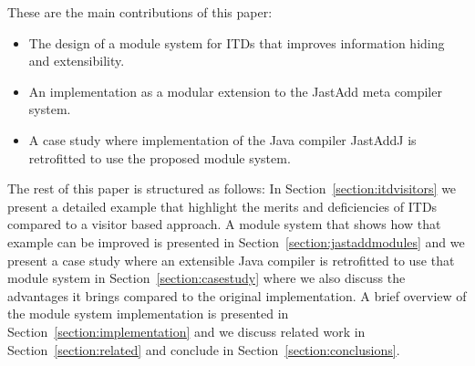 These are the main contributions of this paper:
\begin{itemize}
\item The design of a module system for ITDs that improves information
hiding and extensibility.
\item An implementation as a modular extension to the Jast\-Add meta 
compiler system.
\item A case study where implementation of the Java compiler JastAddJ is retrofitted to use the
proposed module system.
\end{itemize}

The rest of this paper is structured as follows: In
Section~\ref{section:itdvisitors} we present a detailed example that
highlight the merits and deficiencies of ITDs compared to a visitor based
approach. A module system that shows how that example can be improved is
presented in Section~\ref{section:jastaddmodules} and we present a case
study where an extensible Java compiler is retrofitted to use that module
system in Section~\ref{section:casestudy} where we also discuss 
the advantages it brings compared to the original implementation. A
brief overview of the module system implementation is presented in
Section~\ref{section:implementation} and we discuss related work in
Section~\ref{section:related} and conclude in
Section~\ref{section:conclusions}.

